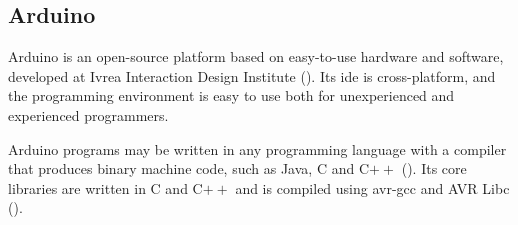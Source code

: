 \subsection{Arduino}
Arduino is an open-source platform based on easy-to-use hardware and software, developed at Ivrea Interaction Design Institute  (\cite{arduino2}). Its \acrfull{ide} is cross-platform, and the programming environment is easy to use both for unexperienced and experienced programmers.

Arduino programs may be written in any programming language with a compiler that produces binary machine code, such as Java, C and C$++$ (\cite{arduino}). Its core libraries are written in C and C$++$ and is compiled using avr-gcc and AVR Libc (\cite{arduinobuild}).